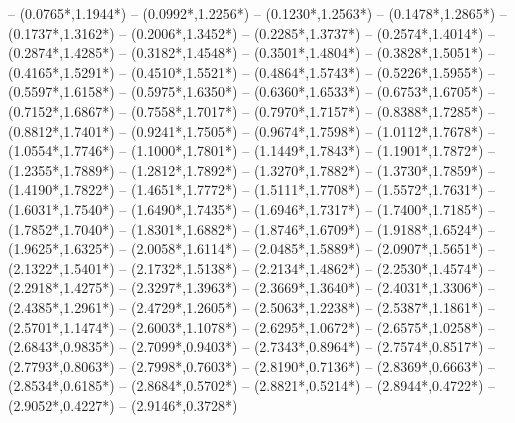 {	-- ({0.0765*\dx},{1.1944*\dy})
	-- ({0.0992*\dx},{1.2256*\dy})
	-- ({0.1230*\dx},{1.2563*\dy})
	-- ({0.1478*\dx},{1.2865*\dy})
	-- ({0.1737*\dx},{1.3162*\dy})
	-- ({0.2006*\dx},{1.3452*\dy})
	-- ({0.2285*\dx},{1.3737*\dy})
	-- ({0.2574*\dx},{1.4014*\dy})
	-- ({0.2874*\dx},{1.4285*\dy})
	-- ({0.3182*\dx},{1.4548*\dy})
	-- ({0.3501*\dx},{1.4804*\dy})
	-- ({0.3828*\dx},{1.5051*\dy})
	-- ({0.4165*\dx},{1.5291*\dy})
	-- ({0.4510*\dx},{1.5521*\dy})
	-- ({0.4864*\dx},{1.5743*\dy})
	-- ({0.5226*\dx},{1.5955*\dy})
	-- ({0.5597*\dx},{1.6158*\dy})
	-- ({0.5975*\dx},{1.6350*\dy})
	-- ({0.6360*\dx},{1.6533*\dy})
	-- ({0.6753*\dx},{1.6705*\dy})
	-- ({0.7152*\dx},{1.6867*\dy})
	-- ({0.7558*\dx},{1.7017*\dy})
	-- ({0.7970*\dx},{1.7157*\dy})
	-- ({0.8388*\dx},{1.7285*\dy})
	-- ({0.8812*\dx},{1.7401*\dy})
	-- ({0.9241*\dx},{1.7505*\dy})
	-- ({0.9674*\dx},{1.7598*\dy})
	-- ({1.0112*\dx},{1.7678*\dy})
	-- ({1.0554*\dx},{1.7746*\dy})
	-- ({1.1000*\dx},{1.7801*\dy})
	-- ({1.1449*\dx},{1.7843*\dy})
	-- ({1.1901*\dx},{1.7872*\dy})
	-- ({1.2355*\dx},{1.7889*\dy})
	-- ({1.2812*\dx},{1.7892*\dy})
	-- ({1.3270*\dx},{1.7882*\dy})
	-- ({1.3730*\dx},{1.7859*\dy})
	-- ({1.4190*\dx},{1.7822*\dy})
	-- ({1.4651*\dx},{1.7772*\dy})
	-- ({1.5111*\dx},{1.7708*\dy})
	-- ({1.5572*\dx},{1.7631*\dy})
	-- ({1.6031*\dx},{1.7540*\dy})
	-- ({1.6490*\dx},{1.7435*\dy})
	-- ({1.6946*\dx},{1.7317*\dy})
	-- ({1.7400*\dx},{1.7185*\dy})
	-- ({1.7852*\dx},{1.7040*\dy})
	-- ({1.8301*\dx},{1.6882*\dy})
	-- ({1.8746*\dx},{1.6709*\dy})
	-- ({1.9188*\dx},{1.6524*\dy})
	-- ({1.9625*\dx},{1.6325*\dy})
	-- ({2.0058*\dx},{1.6114*\dy})
	-- ({2.0485*\dx},{1.5889*\dy})
	-- ({2.0907*\dx},{1.5651*\dy})
	-- ({2.1322*\dx},{1.5401*\dy})
	-- ({2.1732*\dx},{1.5138*\dy})
	-- ({2.2134*\dx},{1.4862*\dy})
	-- ({2.2530*\dx},{1.4574*\dy})
	-- ({2.2918*\dx},{1.4275*\dy})
	-- ({2.3297*\dx},{1.3963*\dy})
	-- ({2.3669*\dx},{1.3640*\dy})
	-- ({2.4031*\dx},{1.3306*\dy})
	-- ({2.4385*\dx},{1.2961*\dy})
	-- ({2.4729*\dx},{1.2605*\dy})
	-- ({2.5063*\dx},{1.2238*\dy})
	-- ({2.5387*\dx},{1.1861*\dy})
	-- ({2.5701*\dx},{1.1474*\dy})
	-- ({2.6003*\dx},{1.1078*\dy})
	-- ({2.6295*\dx},{1.0672*\dy})
	-- ({2.6575*\dx},{1.0258*\dy})
	-- ({2.6843*\dx},{0.9835*\dy})
	-- ({2.7099*\dx},{0.9403*\dy})
	-- ({2.7343*\dx},{0.8964*\dy})
	-- ({2.7574*\dx},{0.8517*\dy})
	-- ({2.7793*\dx},{0.8063*\dy})
	-- ({2.7998*\dx},{0.7603*\dy})
	-- ({2.8190*\dx},{0.7136*\dy})
	-- ({2.8369*\dx},{0.6663*\dy})
	-- ({2.8534*\dx},{0.6185*\dy})
	-- ({2.8684*\dx},{0.5702*\dy})
	-- ({2.8821*\dx},{0.5214*\dy})
	-- ({2.8944*\dx},{0.4722*\dy})
	-- ({2.9052*\dx},{0.4227*\dy})
	-- ({2.9146*\dx},{0.3728*\dy})
}

